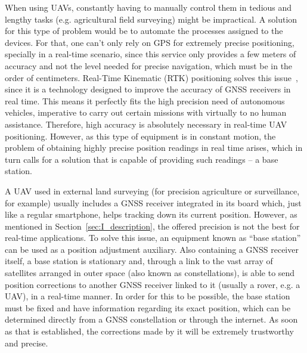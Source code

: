 When using UAVs, constantly having to manually control them in tedious and lengthy tasks (e.g. agricultural field surveying) might be impractical.
A solution for this type of problem would be to automate the processes assigned to the devices. For that, one can't only rely on GPS for extremely precise positioning, specially in a real-time scenario, since this service only provides a few meters of accuracy and not the level needed for precise navigation, which must be in the order of centimeters. Real-Time Kinematic (RTK) positioning solves this issue~\cite{gps_USGov,8714161},
since it is a technology designed to improve the accuracy of GNSS receivers in real time. This means it perfectly fits the high precision need of autonomous vehicles, imperative to carry out certain missions with virtually to no human assistance. Therefore, high accuracy is absolutely necessary in real-time UAV positioning.
However, as this type of equipment is in constant motion, the problem of obtaining highly precise position readings in real time arises, which in turn calls for a solution that is capable of providing such readings -- a base station.

A UAV used in external land surveying (for precision agriculture or surveillance, for example) usually includes a GNSS receiver integrated in its board which, just like a regular smartphone, helps tracking down its current position.
However, as mentioned in Section~\ref{sec:I_description}, the offered precision is not the best for real-time applications.
To solve this issue, an equipment known as ``base station'' can be used as a position adjustment auxiliary.
Also containing a GNSS receiver itself, a base station is stationary and, through a link to the vast array of satellites arranged in outer space (also known as constellations), is able to send position corrections to another GNSS receiver linked to it (usually a rover, e.g. a UAV), in a real-time manner.
In order for this to be possible, the base station must be fixed and have information regarding its exact position, which can be determined directly from a GNSS constellation or through the internet.
As soon as that is established, the corrections made by it will be extremely trustworthy and precise.

